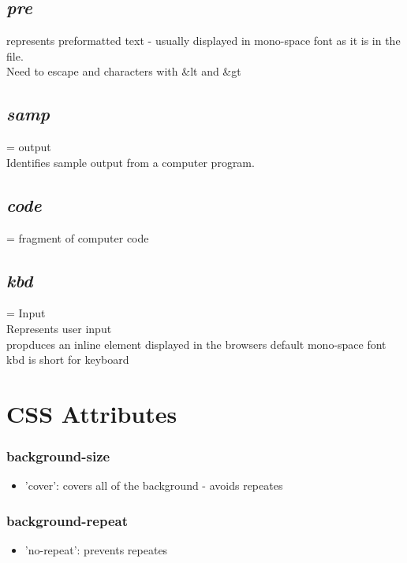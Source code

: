 \documentclass[]{article}
\newcommand{\<}{\guilsinglleft}
\renewcommand{\>}{\guilsinglright}
\renewcommand{\it}[1]{\textit{#1}}
\begin{document}
\subsection{\it{pre}}
represents preformatted text - usually displayed in mono-space font as it is in the file.
\\
Need to escape \< and \> characters with \&lt and \&gt

\subsection{\it{samp}}
= output\\
Identifies sample output from a computer program.

\subsection{\it{code}}
= fragment of computer code

\subsection{\it{kbd}}
= Input\\
Represents user input\\
propduces an inline element displayed in the browsers default mono-space font\\
kbd is short for keyboard

\section{CSS Attributes}
\subsubsection{background-size}
\begin{itemize}
	\item 'cover': covers all of the background - avoids repeates
\end{itemize}
\subsubsection{background-repeat}
\begin{itemize}
	\item 'no-repeat': prevents repeates
\end{itemize}
\end{document}
